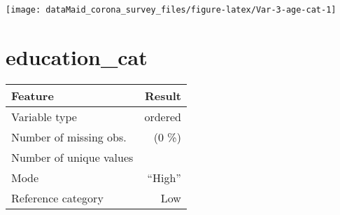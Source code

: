 \documentclass[
]{report}
\begin{document}
\begin{minipage}{0.25 \textwidth}

\begin{center}\texttt{[image: dataMaid\_corona\_survey\_files/figure-latex/Var-3-age-cat-1]} \end{center}

\end{minipage}

\noindent\makebox[\linewidth]{\rule{\textwidth}{0.4pt}}

\hypertarget{education_cat}{%
\section{education\_cat}\label{education_cat}}

\begin{minipage}{0.75 \textwidth}

\begin{longtable}[]{@{}lr@{}}
\toprule
\begin{minipage}[b]{0.34\columnwidth}\raggedright
Feature\strut
\end{minipage} & \begin{minipage}[b]{0.13\columnwidth}\raggedleft
Result\strut
\end{minipage}\tabularnewline
\midrule
\endhead
\begin{minipage}[t]{0.34\columnwidth}\raggedright
Variable type\strut
\end{minipage} & \begin{minipage}[t]{0.13\columnwidth}\raggedleft
ordered\strut
\end{minipage}\tabularnewline
\begin{minipage}[t]{0.34\columnwidth}\raggedright
Number of missing obs.\strut
\end{minipage} & \begin{minipage}[t]{0.13\columnwidth}\raggedleft
0 (0 \%)\strut
\end{minipage}\tabularnewline
\begin{minipage}[t]{0.34\columnwidth}\raggedright
Number of unique values\strut
\end{minipage} & \begin{minipage}[t]{0.13\columnwidth}\raggedleft
3\strut
\end{minipage}\tabularnewline
\begin{minipage}[t]{0.34\columnwidth}\raggedright
Mode\strut
\end{minipage} & \begin{minipage}[t]{0.13\columnwidth}\raggedleft
``High''\strut
\end{minipage}\tabularnewline
\begin{minipage}[t]{0.34\columnwidth}\raggedright
Reference category\strut
\end{minipage} & \begin{minipage}[t]{0.13\columnwidth}\raggedleft
Low\strut
\end{minipage}\tabularnewline
\bottomrule
\end{longtable}

\end{minipage}
\end{document}

